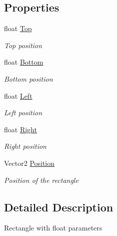 \subsection*{Properties}
\begin{DoxyCompactItemize}
\item 
float \hyperlink{class_hel_project_1_1_tools_1_1_f_rectangle_a40203015f0e458f97ad0f2ba7017da7d}{Top}
\begin{DoxyCompactList}\small\item\em Top position \end{DoxyCompactList}\item 
float \hyperlink{class_hel_project_1_1_tools_1_1_f_rectangle_aa47c6f4c53265c8a18f6809ddafc387e}{Bottom}
\begin{DoxyCompactList}\small\item\em Bottom position \end{DoxyCompactList}\item 
float \hyperlink{class_hel_project_1_1_tools_1_1_f_rectangle_a3908c6198bfd09f1823f9367e50c22a4}{Left}
\begin{DoxyCompactList}\small\item\em Left position \end{DoxyCompactList}\item 
float \hyperlink{class_hel_project_1_1_tools_1_1_f_rectangle_ad758ded56c229a9a801193c0671cd5da}{Right}
\begin{DoxyCompactList}\small\item\em Right position \end{DoxyCompactList}\item 
Vector2 \hyperlink{class_hel_project_1_1_tools_1_1_f_rectangle_a77d6c7b832edfa34e2a4402c400d8e59}{Position}
\begin{DoxyCompactList}\small\item\em Position of the rectangle \end{DoxyCompactList}\end{DoxyCompactItemize}


\subsection{Detailed Description}
Rectangle with float parameters 



